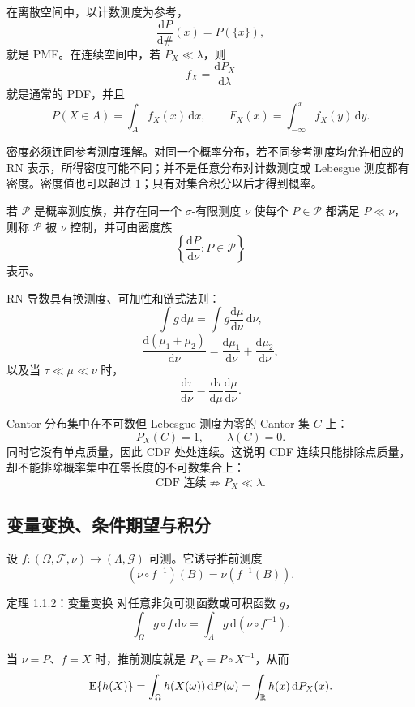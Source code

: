 在离散空间中，以计数测度为参考，
\[
 \frac{\mathrm dP}{\mathrm d\#}(x)=P(\{x\}),
\]
就是 PMF。在连续空间中，若 $P_X\ll\lambda$，则
\[
 f_X=\frac{\mathrm dP_X}{\mathrm d\lambda}
\]
就是通常的 PDF，并且
\[
 P(X\in A)=\int_A f_X(x)\,\mathrm dx,
 \qquad
 F_X(x)=\int_{-\infty}^{x}f_X(y)\,\mathrm dy.
\]

\begin{notebox}[密度依赖参考测度]
密度必须连同参考测度理解。对同一个概率分布，若不同参考测度均允许相应的 RN 表示，所得密度可能不同；并不是任意分布对计数测度或 Lebesgue 测度都有密度。密度值也可以超过 $1$；只有对集合积分以后才得到概率。
\end{notebox}

若 $\mathcal P$ 是概率测度族，并存在同一个 $\sigma$-有限测度 $\nu$ 使每个 $P\in\mathcal P$ 都满足 $P\ll\nu$，则称 $\mathcal P$ 被 $\nu$ 控制，并可由密度族
\[
 \left\{\frac{\mathrm dP}{\mathrm d\nu}:P\in\mathcal P\right\}
\]
表示。

RN 导数具有换测度、可加性和链式法则：
\[
 \int g\,\mathrm d\mu
 =\int g\frac{\mathrm d\mu}{\mathrm d\nu}\,\mathrm d\nu,
\]
\[
 \frac{\mathrm d(\mu_1+\mu_2)}{\mathrm d\nu}
 =\frac{\mathrm d\mu_1}{\mathrm d\nu}
 +\frac{\mathrm d\mu_2}{\mathrm d\nu},
\]
以及当 $\tau\ll\mu\ll\nu$ 时，
\[
 \frac{\mathrm d\tau}{\mathrm d\nu}
 =\frac{\mathrm d\tau}{\mathrm d\mu}
  \frac{\mathrm d\mu}{\mathrm d\nu}.
\]

\begin{notebox}
Cantor 分布集中在不可数但 Lebesgue 测度为零的 Cantor 集 $C$ 上：
\[
 P_X(C)=1,\qquad \lambda(C)=0.
\]
同时它没有单点质量，因此 CDF 处处连续。这说明 CDF 连续只能排除点质量，却不能排除概率集中在零长度的不可数集合上：
\[
 \text{CDF 连续}\not\Rightarrow P_X\ll\lambda.
\]
\end{notebox}

\subsection{变量变换、条件期望与积分}

设 $f:(\Omega,\mathcal F,\nu)\to(\Lambda,\mathcal G)$ 可测。它诱导推前测度
\[
 (\nu\circ f^{-1})(B)=\nu(f^{-1}(B)).
\]

\begin{definitionbox}{定理 1.1.2：变量变换}
对任意非负可测函数或可积函数 $g$，
\[
 \int_\Omega g\circ f\,\mathrm d\nu
 =\int_\Lambda g\,\mathrm d(\nu\circ f^{-1}).
\]
\end{definitionbox}

当 $\nu=P$、$f=X$ 时，推前测度就是 $P_X=P\circ X^{-1}$，从而
\[
 \operatorname{E}\{h(X)\}
 =\int_\Omega h(X(\omega))\,\mathrm dP(\omega)
 =\int_\mathbb R h(x)\,\mathrm dP_X(x).
\]


